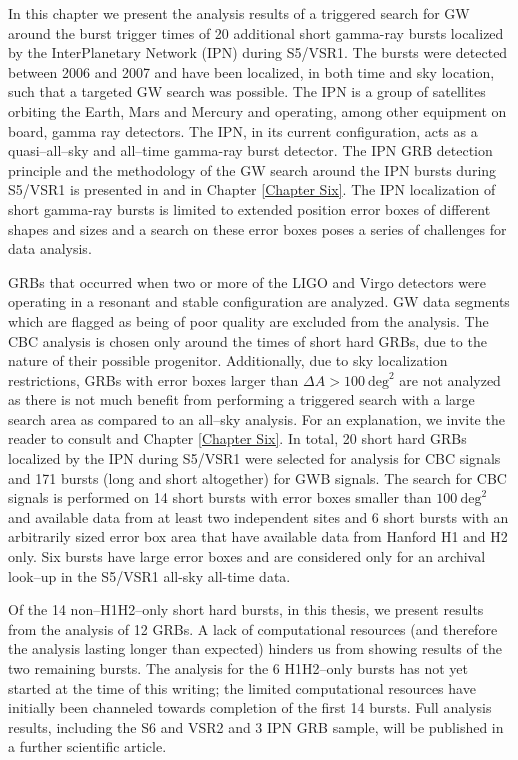 In this chapter we present the analysis results of a triggered search for \ac{GW} around the burst trigger times of 20 additional short gamma-ray bursts localized by the InterPlanetary Network (IPN) during S5/VSR1. The bursts were detected between 2006 and 2007 and have been localized, in both time and sky location, such that a targeted GW search was possible. The IPN is a group of satellites orbiting the Earth, Mars and Mercury and operating, among other equipment on board, gamma ray detectors. The IPN, in its current configuration, acts as a quasi--all--sky and all--time gamma-ray burst detector. The IPN GRB detection principle and the methodology of the GW search around the IPN bursts during S5/VSR1 is presented in \cite{Predoi:2011aa} and in Chapter \ref{Chapter Six}. The IPN localization of short gamma-ray bursts is limited to extended position error boxes of different shapes and sizes and a search on these error boxes poses a series of challenges for data analysis.

GRBs that occurred when two or more of the LIGO and Virgo detectors were operating in a resonant and stable configuration are analyzed. GW data segments which are flagged as being of poor quality are excluded from the analysis. The \ac{CBC} analysis is chosen only around the times of short hard GRBs, due to the nature of their possible progenitor. Additionally, due to sky localization restrictions, GRBs with error boxes larger than $\Delta A > 100~\mathrm{deg}^2$ are not analyzed as there is not much benefit from performing a triggered search with a large search area as compared to an all--sky analysis. For an explanation, we invite the reader to consult \cite{Predoi:2011aa} and Chapter \ref{Chapter Six}. In total, 20 short hard GRBs localized by the IPN during S5/VSR1 were selected for analysis for \ac{CBC} signals and 171 bursts (long and short altogether) for GWB signals. The search for \ac{CBC} signals is performed on 14 short bursts with error boxes smaller than $100~\mathrm{deg}^2$ and available data from at least two independent sites and 6 short bursts with an arbitrarily sized error box area that have available data from Hanford H1 and H2 only. Six bursts have large error boxes and are considered only for an archival look--up in the S5/VSR1 all-sky all-time data.

Of the 14 non--H1H2--only short hard bursts, in this thesis, we present results from the analysis of 12 GRBs. A lack of computational resources (and therefore the analysis lasting longer than expected) hinders us from showing results of the two remaining bursts. The analysis for the 6 H1H2--only bursts has not yet started at the time of this writing; the limited computational resources have initially been channeled towards completion of the first 14 bursts. Full analysis results, including the S6 and VSR2 and 3 IPN GRB sample, will be published in a further scientific article.

